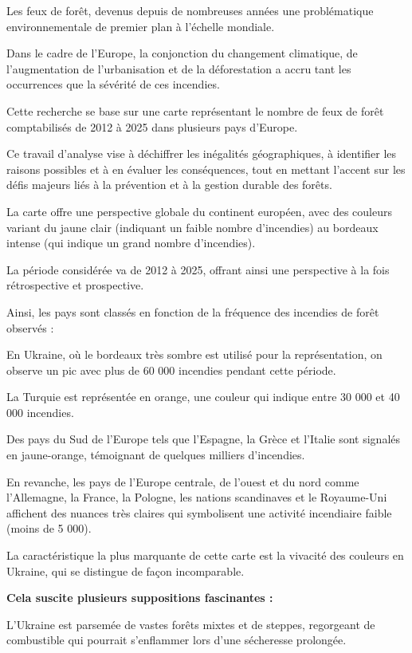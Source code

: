 \documentclass[
]{article}
\begin{document}
Les feux de forêt, devenus depuis de nombreuses années une problématique
environnementale de premier plan à l'échelle mondiale.

Dans le cadre de l'Europe, la conjonction du changement climatique, de
l'augmentation de l'urbanisation et de la déforestation a accru tant les
occurrences que la sévérité de ces incendies.

Cette recherche se base sur une carte représentant le nombre de feux de
forêt comptabilisés de 2012 à 2025 dans plusieurs pays d'Europe.

Ce travail d'analyse vise à déchiffrer les inégalités géographiques, à
identifier les raisons possibles et à en évaluer les conséquences, tout
en mettant l'accent sur les défis majeurs liés à la prévention et à la
gestion durable des forêts.

La carte offre une perspective globale du continent européen, avec des
couleurs variant du jaune clair (indiquant un faible nombre d'incendies)
au bordeaux intense (qui indique un grand nombre d'incendies).

La période considérée va de 2012 à 2025, offrant ainsi une perspective à
la fois rétrospective et prospective.

Ainsi, les pays sont classés en fonction de la fréquence des incendies
de forêt observés :

En Ukraine, où le bordeaux très sombre est utilisé pour la
représentation, on observe un pic avec plus de 60 000 incendies pendant
cette période.

La Turquie est représentée en orange, une couleur qui indique entre 30
000 et 40 000 incendies.

Des pays du Sud de l'Europe tels que l'Espagne, la Grèce et l'Italie
sont signalés en jaune-orange, témoignant de quelques milliers
d'incendies.

En revanche, les pays de l'Europe centrale, de l'ouest et du nord comme
l'Allemagne, la France, la Pologne, les nations scandinaves et le
Royaume-Uni affichent des nuances très claires qui symbolisent une
activité incendiaire faible (moins de 5 000).

La caractéristique la plus marquante de cette carte est la vivacité des
couleurs en Ukraine, qui se distingue de façon incomparable.

\textbf{Cela suscite plusieurs suppositions fascinantes :}

L'Ukraine est parsemée de vastes forêts mixtes et de steppes, regorgeant
de combustible qui pourrait s'enflammer lors d'une sécheresse prolongée.
\end{document}
